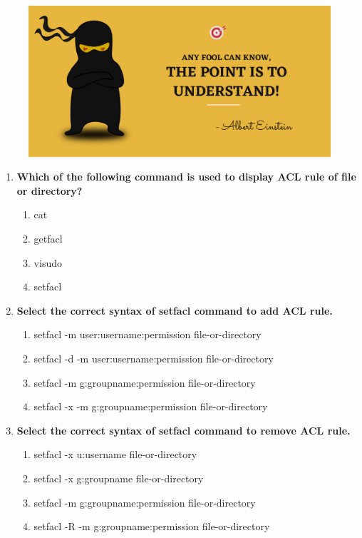 \setlength{\columnsep}{3pt}
\begin{flushleft}
	
	\paragraph{}
	\bigskip
	
	\begin{figure}[h!]
		\centering
		\includegraphics[scale=.2]{content/practise.jpg}
	\end{figure}	
	\begin{enumerate}
		\item \textbf{Which of the following command is used to display ACL rule of file or directory?}
		\begin{enumerate}[label=(\alph*)]
			\item cat
			\item getfacl  %
			\item visudo
			\item setfacl  
		\end{enumerate}
		\bigskip
		\bigskip	
		
		\item \textbf{Select the correct syntax of \textbf{setfacl} command to add ACL rule.}
		\begin{enumerate}[label=(\alph*)]
			\item setfacl -m user:username:permission  file-or-directory  
			\item setfacl -d -m user:username:permission  file-or-directory
			\item setfacl -m g:groupname:permission  file-or-directory    %
			\item setfacl -x -m g:groupname:permission  file-or-directory
		\end{enumerate}
		\bigskip
		\bigskip
		
		
		\item \textbf{Select the correct syntax of setfacl command to remove ACL rule.}
		\begin{enumerate}[label=(\alph*)]
			\item setfacl -x u:username  file-or-directory  %
			\item setfacl -x g:groupname  file-or-directory   %
			\item setfacl -m g:groupname:permission  file-or-directory
			\item setfacl -R -m g:groupname:permission  file-or-directory   
		\end{enumerate}
	

\end{enumerate}
\end{flushleft}
